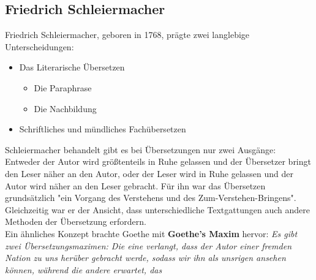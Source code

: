 \documentclass{article}
\begin{document}
	\subsection{Friedrich Schleiermacher}
	Friedrich Schleiermacher, geboren in 1768, prägte zwei langlebige Unterscheidungen:
	\begin{itemize}
		\item{Das Literarische Übersetzen}
		\begin{itemize}
		\item{Die Paraphrase}
		\item{Die Nachbildung}
		\end{itemize}
		\item{Schriftliches und mündliches Fachübersetzen}
	\end{itemize}
	Schleiermacher behandelt gibt es bei Übersetzungen nur zwei Ausgänge: Entweder der Autor wird größtenteils in Ruhe gelassen und der Übersetzer bringt den Leser näher an den Autor, oder der Leser wird in Ruhe gelassen und der Autor wird näher an den Leser gebracht. Für ihn war das Übersetzen grundsätzlich "ein Vorgang des Verstehens und des Zum-Verstehen-Bringens". \\
	Gleichzeitig war er der Ansicht, dass unterschiedliche Textgattungen auch andere Methoden der Übersetzung erfordern. \\
	Ein ähnliches Konzept brachte Goethe mit \textbf{Goethe's Maxim} hervor: \textit{Es gibt zwei Übersetzungsmaximen: Die eine verlangt, dass der Autor einer fremden Nation zu uns herüber gebracht werde, sodass wir ihn als unsrigen ansehen können, während die andere erwartet, das}
\end{document}
